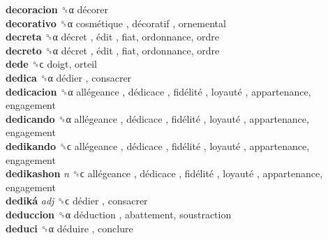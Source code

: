 \textbf{decoracion} ␝α   décorer   \\
\textbf{decorativo} ␝α   cosmétique ,  décoratif , ornemental  \\
\textbf{decreta} ␝α   décret ,  édit , fiat, ordonnance, ordre  \\
\textbf{decreto} ␝α   décret ,  édit , fiat, ordonnance, ordre  \\
\textbf{dede} ␝ϲ  doigt, orteil  \\
\textbf{dedica} ␝α   dédier , consacrer  \\
\textbf{dedicacion} ␝α   allégeance ,  dédicace ,  fidélité ,  loyauté , appartenance, engagement  \\
\textbf{dedicando} ␝α   allégeance ,  dédicace ,  fidélité ,  loyauté , appartenance, engagement  \\
\textbf{dedikando} ␝ϲ   allégeance ,  dédicace ,  fidélité ,  loyauté , appartenance, engagement  \\
\textbf{dedikashon} \emph{n}  ␝ϲ   allégeance ,  dédicace ,  fidélité ,  loyauté , appartenance, engagement  \\
\textbf{dediká} \emph{adj}  ␝ϲ   dédier , consacrer  \\
\textbf{deduccion} ␝α   déduction , abattement, soustraction  \\
\textbf{deduci} ␝α   déduire , conclure  \\
